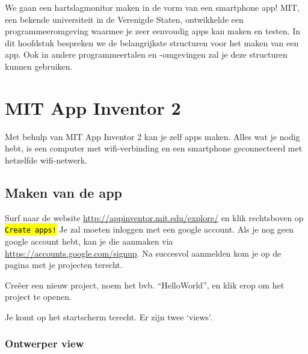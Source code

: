 
\begin{samenvatting}
We gaan een hartslagmonitor maken in de vorm van een smartphone app!
MIT, een bekende universiteit in de Verenigde Staten, ontwikkelde een programmeeromgeving waarmee je zeer eenvoudig apps kan maken en testen. In dit hoofdstuk bespreken we de belangrijkste structuren voor het maken van een app. Ook in andere programmeertalen en -omgevingen zal je deze structuren kunnen gebruiken.
\end{samenvatting}
%

\section{MIT App Inventor 2}
\label{sec:Mod2_Sec1}
%
Met behulp van MIT App Inventor 2 kan je zelf apps maken. Alles wat je nodig hebt, is een computer met wifi-verbinding en een smartphone geconnecteerd met hetzelfde wifi-netwerk.

\subsection{Maken van de app}

Surf naar de website \url{http://appinventor.mit.edu/explore/} en klik rechtsboven op \hl{\texttt{Create apps!}} Je zal moeten inloggen met een google account. Als je nog geen google account hebt, kan je die aanmaken via \url{https://accounts.google.com/signup}. Na succesvol aanmelden kom je op de pagina met je projecten terecht. 

Cre\"eer een nieuw project, noem het bvb. \textquotedblleft HelloWorld\textquotedblright, en klik erop om het project te openen. 

Je komt op het startscherm terecht. Er zijn twee \textquoteleft views\textquoteright. 

\subsubsection{Ontwerper view}

